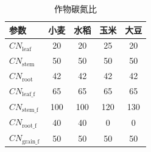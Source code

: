 \begin{table}[htbp]
  \centering
  \caption{作物碳氮比}
  \label{tab:作物碳氮比}
\begin{tabular}{@{}lcccc@{}}
\toprule
参数         & 小麦  & 水稻  & 玉米  & 大豆  \\ \midrule
$CN_{\mathrm{leaf}}$     & 20  & 20  & 25  & 20  \\
$CN_{\mathrm{stem}}$     & 50  & 50  & 50  & 50  \\
$CN_{\mathrm{root}}$     & 42  & 42  & 42  & 42  \\
$CN_{\mathrm{leaf\_f}}$  & 65  & 65  & 65  & 65  \\
$CN_{\mathrm{stem\_f}}$  & 100 & 100 & 120 & 130 \\
$CN_{\mathrm{root\_f}}$  & 40  & 40  & 0   & 0   \\
$CN_{\mathrm{grain\_f}}$ & 50  & 50  & 50  & 50  \\ \bottomrule
\end{tabular}
\end{table}

%

%



